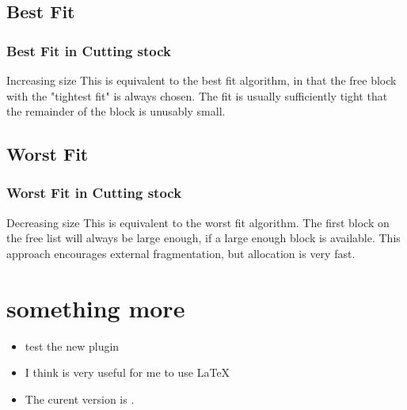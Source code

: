 \documentclass[slidestop,compress,mathserif,brown]{beamer}
\begin{document}
\begin{CJK}{UTF8}{kai}
\subsection{Best Fit}
\begin{frame}
\frametitle{Best Fit in Cutting stock}
Increasing size
\newline
This is equivalent to the best fit algorithm, in that the free block with the "tightest fit" is always chosen. The fit is usually sufficiently tight that the remainder of the block is unusably small.
\end{frame}

\subsection{Worst Fit}
\frametitle{Worst Fit in Cutting stock}
\begin{frame}
Decreasing size
\newline
This is equivalent to the worst fit algorithm. The first block on the free list will always be large enough, if a large enough block is available. This approach encourages external fragmentation, but allocation is very fast.
\end{frame}

\section{something more}
\begin{frame}
\begin{itemize}
	\item test the new plugin
	\item I think is very useful for me to use \LaTeX{}
	\item The curent version is \LaTeXe.
\end{itemize}
\end{frame}
\end{CJK}
\end{document}
